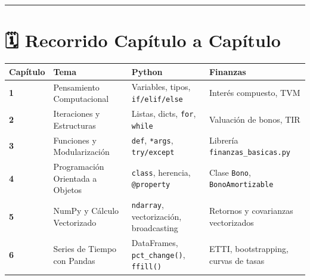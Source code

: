 \documentclass[
  spanish,
  letterpaper,
  DIV=11,
  numbers=noendperiod]{scrreprt}
\begin{document}
\begin{center}\rule{0.5\linewidth}{0.5pt}\end{center}

\section*{🗓️ Recorrido Capítulo a
Capítulo}\label{recorrido-capuxedtulo-a-capuxedtulo}


\begin{longtable}[]{@{}
  >{\centering\arraybackslash}p{}
  >{\raggedright\arraybackslash}p{}
  >{\raggedright\arraybackslash}p{}
  >{\raggedright\arraybackslash}p{}@{}}
\toprule\noalign{}
\begin{minipage}[b]{\linewidth}\centering
Capítulo
\end{minipage} & \begin{minipage}[b]{\linewidth}\raggedright
Tema
\end{minipage} & \begin{minipage}[b]{\linewidth}\raggedright
Python
\end{minipage} & \begin{minipage}[b]{\linewidth}\raggedright
Finanzas
\end{minipage} \\
\midrule\noalign{}
\endhead
\bottomrule\noalign{}
\endlastfoot
\textbf{1} & Pensamiento Computacional & Variables, tipos,
\texttt{if/elif/else} & Interés compuesto, TVM \\
\textbf{2} & Iteraciones y Estructuras & Listas, dicts, \texttt{for},
\texttt{while} & Valuación de bonos, TIR \\
\textbf{3} & Funciones y Modularización & \texttt{def}, \texttt{*args},
\texttt{try/except} & Librería \texttt{finanzas\_basicas.py} \\
\textbf{4} & Programación Orientada a Objetos & \texttt{class},
herencia, \texttt{@property} & Clase \texttt{Bono},
\texttt{BonoAmortizable} \\
\textbf{5} & NumPy y Cálculo Vectorizado & \texttt{ndarray},
vectorización, broadcasting & Retornos y covarianzas vectorizados \\
\textbf{6} & Series de Tiempo con Pandas & DataFrames,
\texttt{pct\_change()}, \texttt{ffill()} & ETTI, bootstrapping, curvas
de tasas \\
\end{longtable}
\end{document}
